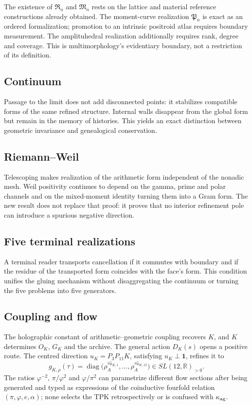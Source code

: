 The existence of \(\mathfrak R_n\) and \(\mathfrak M_n\) rests on the lattice and material reference constructions already obtained. The moment-curve realization \(\mathfrak P_n\) is exact as an ordered formalization; promotion to an intrinsic positroid atlas requires boundary measurement. The amplituhedral realization additionally requires rank, degree and coverage. This is multimorphology's evidentiary boundary, not a restriction of its definition.

\subsection{Continuum}

Passage to the limit does not add disconnected points: it stabilizes compatible forms of the same refined structure. Internal walls disappear from the global form but remain in the memory of histories. This yields an exact distinction between geometric invariance and genealogical conservation.

\subsection{Riemann--Weil}

Telescoping makes realization of the arithmetic form independent of the nonadic mesh. Weil positivity continues to depend on the gamma, prime and polar channels and on the mixed-moment identity turning them into a Gram form. The new result does not replace that proof: it proves that no interior refinement pole can introduce a spurious negative direction.

\subsection{Five terminal realizations}

A terminal reader transports cancellation if it commutes with boundary and if the residue of the transported form coincides with the face's form. This condition unifies the gluing mechanism without disaggregating the continuum or turning the five problems into five generators.

\subsection{Coupling and flow}

The holographic constant of arithmetic--geometric coupling recovers \(K\), and \(K\) determines \(O_K\), \(G_K\) and the archive. The general action \(D_K(s)\) opens a positive route. The centred direction \(u_K=P_3P_{11}K\), satisfying \(u_K\perp\mathbf1\), refines it to
\[
g_{K,\rho}(\tau)=
\operatorname{diag}
\bigl(\rho_A^{\tau\widehat u_{K,1}},\ldots,
\rho_A^{\tau\widehat u_{K,12}}\bigr)\in SL(12,\mathbb R)_{>0}.
\]
The ratios \(\varphi^{-2}\), \(\pi/\varphi^2\) and \(\varphi/\pi^2\) can parametrize different flow sections after being generated and typed as expressions of the coinductive fourfold relation \((\pi,\varphi,e,\alpha)\); none selects the TPK retrospectively or is confused with \(\kappa_{\rm ag}\).

